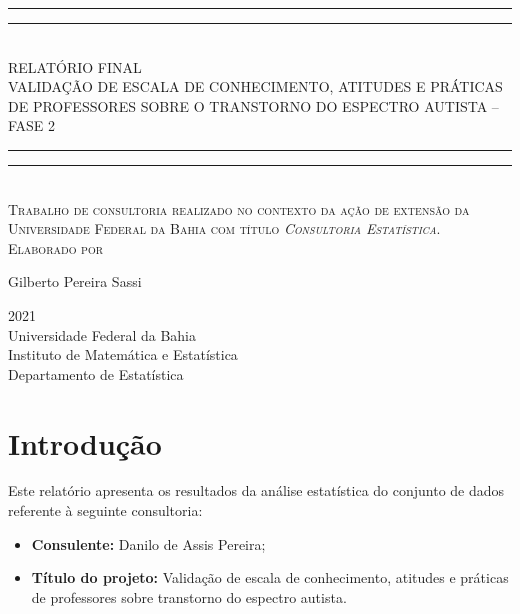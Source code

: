 \documentclass[
]{article}
\author{}
\date{\vspace{-2.5em}}
\providecommand{\tightlist}{%
  \setlength{\itemsep}{0pt}\setlength{\parskip}{0pt}}
\newlength{\drop}
\begin{document}
\onehalfspacing

\begin{titlepage}
    \textheight
    \centering
    \vspace*{\baselineskip}
    \rule{\textwidth}{1.6pt}\vspace*{-\baselineskip}\vspace*{2pt}
    \rule{\textwidth}{0.4pt}\\[\baselineskip]
    {\LARGE RELATÓRIO FINAL \\ 
    \vspace*{\baselineskip}
    VALIDAÇÃO DE ESCALA DE CONHECIMENTO, ATITUDES E PRÁTICAS DE PROFESSORES SOBRE O TRANSTORNO DO ESPECTRO AUTISTA -- FASE 2}\\[0.2\baselineskip]
    \rule{\textwidth}{0.4pt}\vspace*{-\baselineskip}\vspace{3.2pt}
    \rule{\textwidth}{1.6pt}\\[\baselineskip]
    \scshape
    Trabalho de consultoria realizado no contexto da ação de extensão da Universidade Federal da Bahia com título \textit{Consultoria Estatística}. \\
    \vspace*{2\baselineskip}
    Elaborado por \\[\baselineskip]
    {\Large Gilberto Pereira Sassi\par}
    \vfill
    {\scshape 2021} \\
    {\large Universidade Federal da Bahia}\\
    {\large Instituto de Matemática e Estatística}\\
    {\large Departamento de Estatística}\par
  \end{titlepage}

\newpage

\tableofcontents

\newpage

\hypertarget{introduuxe7uxe3o}{%
\section{Introdução}\label{introduuxe7uxe3o}}

Este relatório apresenta os resultados da análise estatística do conjunto de dados referente à seguinte consultoria:

\begin{itemize}
\tightlist
\item
  \textbf{Consulente:} Danilo de Assis Pereira;
\item
  \textbf{Título do projeto:} Validação de escala de conhecimento, atitudes e práticas de professores sobre transtorno do espectro autista.
\end{itemize}
\end{document}
